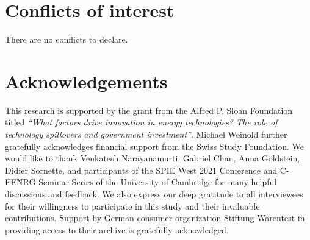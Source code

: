 \documentclass[twoside,twocolumn,9pt]{article}
\renewcommand{\refname}{Notes and references}
\begin{document}
\section*{Conflicts of interest}
There are no conflicts to declare.

\section*{Acknowledgements}
This research is supported by the grant from the Alfred P. Sloan Foundation titled \textit{“What factors drive innovation in energy technologies? The role of technology spillovers and government investment”}. Michael Weinold further gratefully acknowledges financial support from the Swiss Study Foundation. We would like to thank Venkatesh Narayanamurti, Gabriel Chan, Anna Goldstein, Didier Sornette, and participants of the SPIE West 2021 Conference and C-EENRG Seminar Series of the University of Cambridge for many helpful discussions and feedback. We also express our deep gratitude to all interviewees for their willingness to participate in this study and their invaluable contributions. Support by German consumer organization Stiftung Warentest in providing access to their archive is gratefully acknowledged.



\balance



\end{document}
